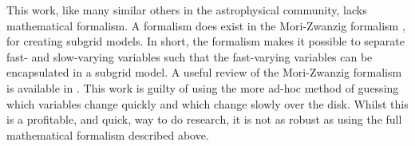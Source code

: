 This work, like many similar others in the astrophysical community, lacks mathematical formalism.
A formalism does exist in the Mori-Zwanzig formalism \citep{zwanzig_nonequilibrium_2001, zwanzig_memory_1961}, for creating subgrid models.
In short, the formalism makes it possible to separate fast- and slow-varying variables such that the fast-varying variables can be encapsulated in a subgrid model.
A useful review of the Mori-Zwanzig formalism is available in \citet{xing_mori-zwanzig_2009}.
This work is guilty of using the more ad-hoc method of guessing which variables change quickly and which change slowly over the disk.
Whilst this is a profitable, and quick, way to do research, it is not as robust as using the full mathematical formalism described above.
